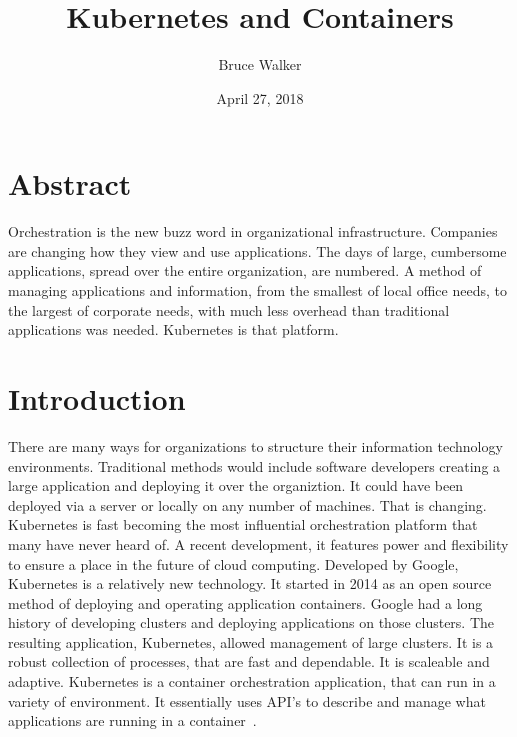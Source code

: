 
\title{Kubernetes and Containers}
\author{Bruce Walker}

 
\date{ April 27, 2018}

\maketitle 
\section{Abstract}

Orchestration is the new buzz word in organizational infrastructure.
Companies are changing how they view and use applications.  The days
of large, cumbersome applications, spread over the entire
organization, are numbered.  A method of
managing applications and information, from the smallest of local 
office needs, to the largest of corporate needs, with much less 
overhead than traditional applications was needed.  Kubernetes is that 
platform.  



\section{Introduction}

There are many ways for organizations to structure their information
technology environments.  Traditional methods would include software
developers creating a large application and deploying it over the
organiztion. It could have been deployed via a server or locally on
any number of machines.  That is changing.  Kubernetes is fast 
becoming the most influential orchestration platform that
many have never heard of.  A recent development, it features power and
flexibility to ensure a place in the future of cloud computing.
Developed by Google, Kubernetes is a relatively new technology.  It
started in 2014 as an open source method of deploying and operating
application containers.  Google had a long history of developing
clusters and deploying applications on those clusters.  The resulting
application, Kubernetes, allowed management of large clusters. It is
a robust collection of processes, that are fast and dependable.  It is
scaleable and adaptive. Kubernetes is a container orchestration
application, that can run in a variety of environment.  It essentially
uses API's to describe and manage what applications are running in a 
container~\cite{concept}.

